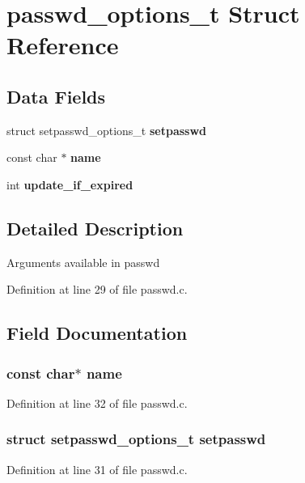 \section{passwd\_\-options\_\-t Struct Reference}
\label{structpasswd__options__t}
\subsection*{Data Fields}
\begin{DoxyCompactItemize}
\item 
struct setpasswd\_\-options\_\-t {\bf setpasswd}
\item 
const char $\ast$ {\bf name}
\item 
int {\bf update\_\-if\_\-expired}
\end{DoxyCompactItemize}


\subsection{Detailed Description}
Arguments available in passwd 

Definition at line 29 of file passwd.c.



\subsection{Field Documentation}
\subsubsection[{name}]{\setlength{\rightskip}{0pt plus 5cm}const char$\ast$ {\bf name}}\label{structpasswd__options__t_a8f8f80d37794cde9472343e4487ba3eb}


Definition at line 32 of file passwd.c.

\subsubsection[{setpasswd}]{\setlength{\rightskip}{0pt plus 5cm}struct setpasswd\_\-options\_\-t {\bf setpasswd}}\label{structpasswd__options__t_a5d0ca7fca7896af46b0b1e7104625e32}


Definition at line 31 of file passwd.c.

